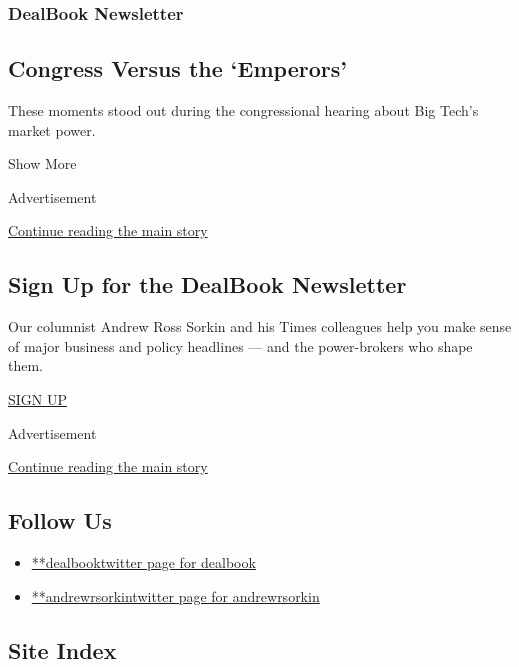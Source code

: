 \begin{enumerate}
  \hypertarget{dealbook-newsletter-2}{%
  \subsubsection{DealBook Newsletter}\label{dealbook-newsletter-2}}

  \hypertarget{congress-versus-the-emperors}{%
  \subsection{Congress Versus the
  `Emperors'}\label{congress-versus-the-emperors}}

  These moments stood out during the congressional hearing about Big
  Tech's market power.
\end{enumerate}

Show More

Advertisement

\protect\hyperlink{after-mid2}{Continue reading the main story}

\hypertarget{sign-up-for-the-dealbook-newsletter}{%
\subsection{Sign Up for the DealBook
Newsletter}\label{sign-up-for-the-dealbook-newsletter}}

Our columnist Andrew Ross Sorkin and his Times colleagues help you make
sense of major business and policy headlines --- and the power-brokers
who shape them.

\href{/newsletters/signup/DK}{SIGN UP}

Advertisement

\protect\hyperlink{after-mktg}{Continue reading the main story}

\hypertarget{follow-us}{%
\subsection{Follow Us}\label{follow-us}}

\begin{itemize}
\tightlist
\item
  \href{https://twitter.com/dealbook}{**dealbooktwitter page for
  dealbook}
\item
  \href{https://twitter.com/andrewrsorkin}{**andrewrsorkintwitter page
  for andrewrsorkin}
\end{itemize}

\hypertarget{site-index}{%
\subsection{Site Index}\label{site-index}}

